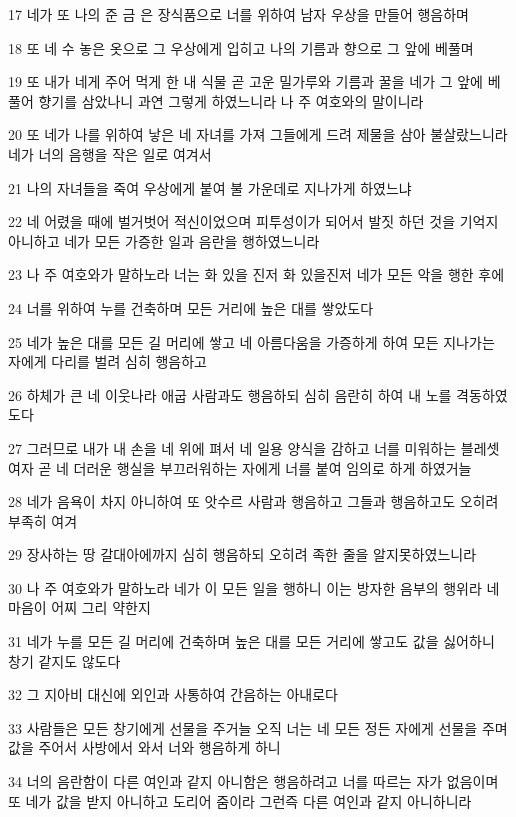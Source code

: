 \par 17 네가 또 나의 준 금 은 장식품으로 너를 위하여 남자 우상을 만들어 행음하며
\par 18 또 네 수 놓은 옷으로 그 우상에게 입히고 나의 기름과 향으로 그 앞에 베풀며
\par 19 또 내가 네게 주어 먹게 한 내 식물 곧 고운 밀가루와 기름과 꿀을 네가 그 앞에 베풀어 향기를 삼았나니 과연 그렇게 하였느니라 나 주 여호와의 말이니라
\par 20 또 네가 나를 위하여 낳은 네 자녀를 가져 그들에게 드려 제물을 삼아 불살랐느니라 네가 너의 음행을 작은 일로 여겨서
\par 21 나의 자녀들을 죽여 우상에게 붙여 불 가운데로 지나가게 하였느냐
\par 22 네 어렸을 때에 벌거벗어 적신이었으며 피투성이가 되어서 발짓 하던 것을 기억지 아니하고 네가 모든 가증한 일과 음란을 행하였느니라
\par 23 나 주 여호와가 말하노라 너는 화 있을 진저 화 있을진저 네가 모든 악을 행한 후에
\par 24 너를 위하여 누를 건축하며 모든 거리에 높은 대를 쌓았도다
\par 25 네가 높은 대를 모든 길 머리에 쌓고 네 아름다움을 가증하게 하여 모든 지나가는 자에게 다리를 벌려 심히 행음하고
\par 26 하체가 큰 네 이웃나라 애굽 사람과도 행음하되 심히 음란히 하여 내 노를 격동하였도다
\par 27 그러므로 내가 내 손을 네 위에 펴서 네 일용 양식을 감하고 너를 미워하는 블레셋 여자 곧 네 더러운 행실을 부끄러워하는 자에게 너를 붙여 임의로 하게 하였거늘
\par 28 네가 음욕이 차지 아니하여 또 앗수르 사람과 행음하고 그들과 행음하고도 오히려 부족히 여겨
\par 29 장사하는 땅 갈대아에까지 심히 행음하되 오히려 족한 줄을 알지못하였느니라
\par 30 나 주 여호와가 말하노라 네가 이 모든 일을 행하니 이는 방자한 음부의 행위라 네 마음이 어찌 그리 약한지
\par 31 네가 누를 모든 길 머리에 건축하며 높은 대를 모든 거리에 쌓고도 값을 싫어하니 창기 같지도 않도다
\par 32 그 지아비 대신에 외인과 사통하여 간음하는 아내로다
\par 33 사람들은 모든 창기에게 선물을 주거늘 오직 너는 네 모든 정든 자에게 선물을 주며 값을 주어서 사방에서 와서 너와 행음하게 하니
\par 34 너의 음란함이 다른 여인과 같지 아니함은 행음하려고 너를 따르는 자가 없음이며 또 네가 값을 받지 아니하고 도리어 줌이라 그런즉 다른 여인과 같지 아니하니라

